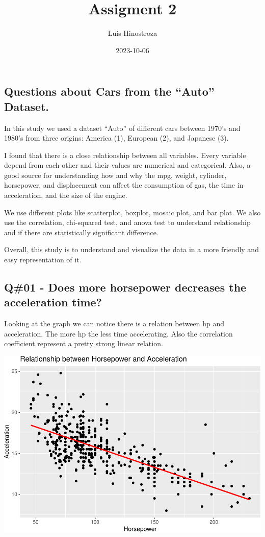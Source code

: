 \documentclass[
]{article}
\title{Assigment 2}
\author{Luis Hinostroza}
\date{2023-10-06}
\begin{document}
\maketitle

\hypertarget{questions-about-cars-from-the-auto-dataset.}{%
\subsection{Questions about Cars from the ``Auto''
Dataset.}\label{questions-about-cars-from-the-auto-dataset.}}

In this study we used a dataset ``Auto'' of different cars between
1970's and 1980's from three origins: America (1), European (2), and
Japanese (3).

I found that there is a close relationship between all variables. Every
variable depend from each other and their values are numerical and
categorical. Also, a good source for understanding how and why the mpg,
weight, cylinder, horsepower, and displacement can affect the
consumption of gas, the time in acceleration, and the size of the
engine.

We use different plots like scatterplot, boxplot, mosaic plot, and bar
plot. We also use the correlation, chi-squared test, and anova test to
understand relationship and if there are statistically significant
difference.

Overall, this study is to understand and visualize the data in a more
friendly and easy representation of it.

\newpage

\hypertarget{q01---does-more-horsepower-decreases-the-acceleration-time}{%
\subsection{Q\#01 - Does more horsepower decreases the acceleration
time?}\label{q01---does-more-horsepower-decreases-the-acceleration-time}}

Looking at the graph we can notice there is a relation between hp and
acceleration. The more hp the less time accelerating. Also the
correlation coefficient represent a pretty strong linear relation.

\includegraphics{QuestionCar_files/figure-latex/unnamed-chunk-1-1.pdf}
\end{document}
